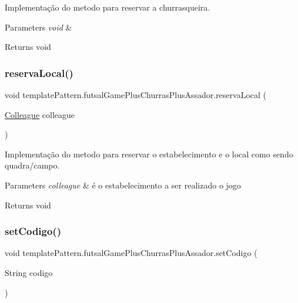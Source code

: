 Implementação do metodo para reservar a churrasqueira. 


\begin{DoxyParams}{Parameters}
{\em void} & \\
\hline
\end{DoxyParams}
\begin{DoxyReturn}{Returns}
void 
\end{DoxyReturn}
\mbox{\label{classtemplate_pattern_1_1futsal_game_plus_churras_plus_assador_a59916d1f9566cc4048912860d82c4ed2}} 
\subsubsection{\texorpdfstring{reservaLocal()}{reservaLocal()}}
{\footnotesize\ttfamily void template\+Pattern.\+futsal\+Game\+Plus\+Churras\+Plus\+Assador.\+reserva\+Local (\begin{DoxyParamCaption}\item[{\mbox{\hyperlink{classmediator_pattern_1_1_colleague}{Colleague}}}]{colleague }\end{DoxyParamCaption})}



Implementação do metodo para reservar o estabelecimento e o local como sendo quadra/campo. 


\begin{DoxyParams}{Parameters}
{\em colleague} & é o estabelecimento a ser realizado o jogo \\
\hline
\end{DoxyParams}
\begin{DoxyReturn}{Returns}
void 
\end{DoxyReturn}
\mbox{\label{classtemplate_pattern_1_1futsal_game_plus_churras_plus_assador_afd0a5b365f3028cc1c0684f82bf222a3}} 
\subsubsection{\texorpdfstring{setCodigo()}{setCodigo()}}
{\footnotesize\ttfamily void template\+Pattern.\+futsal\+Game\+Plus\+Churras\+Plus\+Assador.\+set\+Codigo (\begin{DoxyParamCaption}\item[{String}]{codigo }\end{DoxyParamCaption})}



